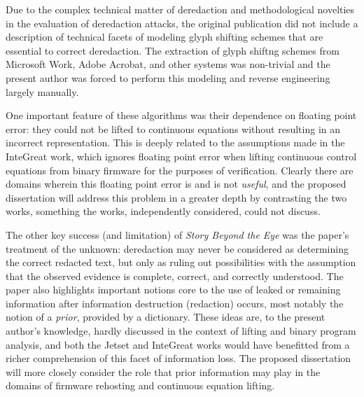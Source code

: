 Due to the complex technical matter of deredaction and methodological novelties in the evaluation of deredaction attacks, the original publication did not include a description of technical facets of modeling glyph shifting schemes that are essential to correct deredaction.
The extraction of glyph shiftng schemes from Microsoft Work, Adobe Acrobat, and other systems was non-trivial and the present author was forced to perform this modeling and reverse engineering largely manually.

One important feature of these algorithms was their dependence on floating point error: they could not be lifted to continuous equations without resulting in an incorrect representation.
This is deeply related to the assumptions made in the InteGreat work, which ignores floating point error when lifting continuous control equations from binary firmware for the purposes of verification.
Clearly there are domains wherein this floating point error is and is not \emph{useful}, and the proposed dissertation will address this problem in a greater depth by contrasting the two works, something the works, independently considered, could not discuss.

The other key success (and limitation) of \emph{Story Beyond the Eye} was the paper's treatment of the unknown: deredaction may never be considered as determining the correct redacted text, but only as ruling out possibilities with the assumption that the observed evidence is complete, correct, and correctly understood.
The paper also highlights important notions core to the use of leaked or remaining information after information destruction (redaction) occurs, most notably the notion of a \emph{prior}, provided by a dictionary.
These ideas are, to the present author's knowledge, hardly discussed in the context of lifting and binary program analysis, and both the Jetset and InteGreat works would have benefitted from a richer comprehension of this facet of information loss.
The proposed dissertation will more closely consider the role that prior information may play in the domains of firmware rehosting and continuous equation lifting.
